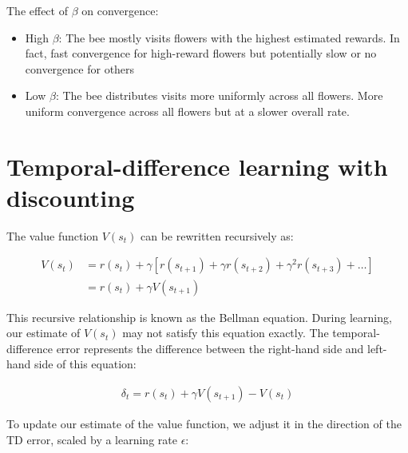 \documentclass{article}
\begin{document}
The effect of $\beta$ on convergence:
\begin{itemize}
\item High $\beta$: The bee mostly visits flowers with the highest estimated rewards. In fact, fast convergence for high-reward flowers but potentially slow or no convergence for others
\item Low $\beta$: The bee distributes visits more uniformly across all flowers. More uniform convergence across all flowers but at a slower overall rate.
\end{itemize}



\section{Temporal-difference learning with discounting}



The value function $V(s_t)$ can be rewritten recursively as:

\begin{align}
V(s_t) &= r(s_t) + \gamma\left[r(s_{t+1}) + \gamma r(s_{t+2}) + \gamma^2 r(s_{t+3}) + \ldots\right]\\
&= r(s_t) + \gamma V(s_{t+1})
\end{align}

This recursive relationship is known as the Bellman equation. During learning, our estimate of $V(s_t)$ may not satisfy this equation exactly. The temporal-difference error represents the difference between the right-hand side and left-hand side of this equation:

\begin{align}
\delta_t = r(s_t) + \gamma V(s_{t+1}) - V(s_t)
\end{align}

To update our estimate of the value function, we adjust it in the direction of the TD error, scaled by a learning rate $\epsilon$:
\end{document}
